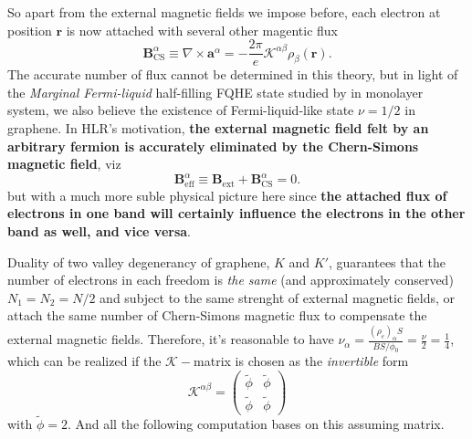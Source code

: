 \documentclass[bachelor,english,numbers]{ustcthesis}
\begin{document}
		So apart from the external magnetic fields we impose before, each electron at position $\bm{r}$ is now attached with several other magentic flux
		\begin{equation}\label{2.2.5}
			\bm{B}^\alpha_{\text{CS}}\equiv\nabla\times\bm{a}^\alpha=-\dfrac{2\pi}{e}\mathcal{K}^{\alpha \beta}\rho_\beta(\bm{r}).
		\end{equation}
		The accurate number of flux cannot be determined in this theory, but in light of the \emph{Marginal Fermi-liquid} half-filling FQHE state studied by \cite{Halperin1995Theory} in monolayer system, we also believe the existence of Fermi-liquid-like state $\nu=1/2$ in graphene. In HLR's motivation, {\bf the external magnetic field felt by an arbitrary fermion is accurately eliminated by the Chern-Simons magnetic field}, viz
		\begin{equation}\label{2.2.6}
			\bm{B}^\alpha_{\text{eff}}\equiv\bm{B}_{\text{ext}}+\bm{B}^\alpha_{\text{CS}}=0.
		\end{equation}
		but with a much more suble physical picture here since {\bf the attached flux of electrons in one band will certainly influence the electrons in the other band as well, and vice versa}.\par
		Duality of two valley degenerancy of graphene, $K$ and $K'$, guarantees that the number of electrons in each freedom is \emph{the same} (and approximately conserved) $N_1=N_2=N/2$ and subject to the same strenght of external magnetic fields, or attach the same number of Chern-Simons magnetic flux to compensate the external magnetic fields. Therefore, it's reasonable to have $\nu_\alpha=\frac{(\rho_e)_{\alpha}S}{BS/\phi_0}=\frac{\nu}{2}=\frac{1}{4}$, which can be realized if the $\mathcal{K}-$matrix is chosen as the \emph{invertible} form
		\begin{equation}\label{2.2.7}
			\mathcal{K}^{\alpha \beta}=\left(\begin{array}{cc}
				\widetilde{\phi}  & \widetilde{\phi}  \\ \widetilde{\phi}  & \widetilde{\phi} 
			\end{array}\right)
		\end{equation}
		with $\widetilde{\phi}=2$. And all the following computation bases on this assuming matrix.
\end{document}
